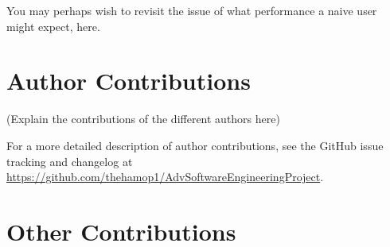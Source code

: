 \documentclass[9pt,software]{livecoms}
\newcommand{\githubrepository}{\url{https://github.com/thehamop1/AdvSoftwareEngineeringProject}}  %
\begin{document}
You may perhaps wish to revisit the issue of what performance a naive user might expect, here.



\section{Author Contributions}
%

(Explain the contributions of the different authors here)

For a more detailed description of author contributions,
see the GitHub issue tracking and changelog at \githubrepository.

\section{Other Contributions}
%





% 


\end{document}
